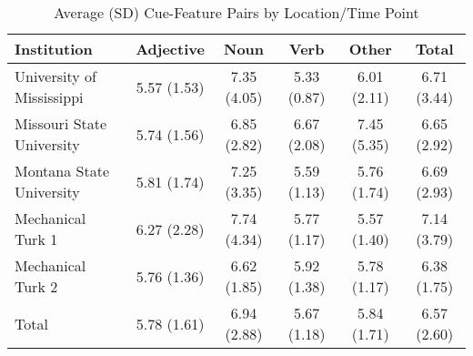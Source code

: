\documentclass[english,,man]{apa6}
\theoremstyle{definition}
\theoremstyle{definition}
\theoremstyle{definition}
\theoremstyle{remark}
\begin{document}
\begin{table}[tbp]
\begin{center}
\begin{threeparttable}
\caption{\label{tab:feature-table}Average (SD) Cue-Feature Pairs by Location/Time Point}
\begin{tabular}{lccccc}
\toprule
Institution & Adjective & Noun & Verb & Other & Total\\
\midrule
University of Mississippi & 5.57 (1.53) & 7.35 (4.05) & 5.33 (0.87) & 6.01 (2.11) & 6.71 (3.44)\\
Missouri State University & 5.74 (1.56) & 6.85 (2.82) & 6.67 (2.08) & 7.45 (5.35) & 6.65 (2.92)\\
Montana State University & 5.81 (1.74) & 7.25 (3.35) & 5.59 (1.13) & 5.76 (1.74) & 6.69 (2.93)\\
Mechanical Turk 1 & 6.27 (2.28) & 7.74 (4.34) & 5.77 (1.17) & 5.57 (1.40) & 7.14 (3.79)\\
Mechanical Turk 2 & 5.76 (1.36) & 6.62 (1.85) & 5.92 (1.38) & 5.78 (1.17) & 6.38 (1.75)\\
Total & 5.78 (1.61) & 6.94 (2.88) & 5.67 (1.18) & 5.84 (1.71) & 6.57 (2.60)\\
\bottomrule
\end{tabular}
\end{threeparttable}
\end{center}
\end{table}
\end{document}

